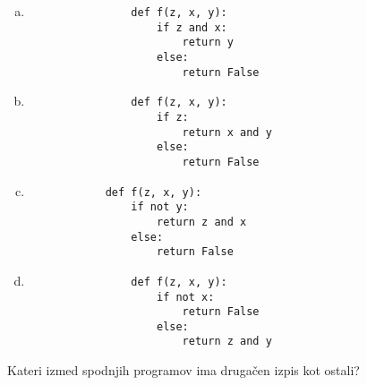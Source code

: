 \documentclass[arhiv, 10pt]{../izpit}
\begin{document}
        \begin{multicols}{2}
        \begin{enumerate}[(a)]
\item 
                \begin{verbatim}
                def f(z, x, y):
                    if z and x:
                        return y
                    else:
                        return False
                \end{verbatim}
            
\item 
                \begin{verbatim}
                def f(z, x, y):
                    if z:
                        return x and y
                    else:
                        return False
                \end{verbatim}
            
\item 
            \begin{verbatim}
            def f(z, x, y):
                if not y:
                    return z and x
                else:
                    return False
            \end{verbatim}
        
\item 
                \begin{verbatim}
                def f(z, x, y):
                    if not x:
                        return False
                    else:
                        return z and y
                \end{verbatim}
            
\end{enumerate}

        \end{multicols}
    
        \naloga*
        
        Kateri izmed spodnjih programov ima drugačen izpis kot ostali?
    
\end{document}
